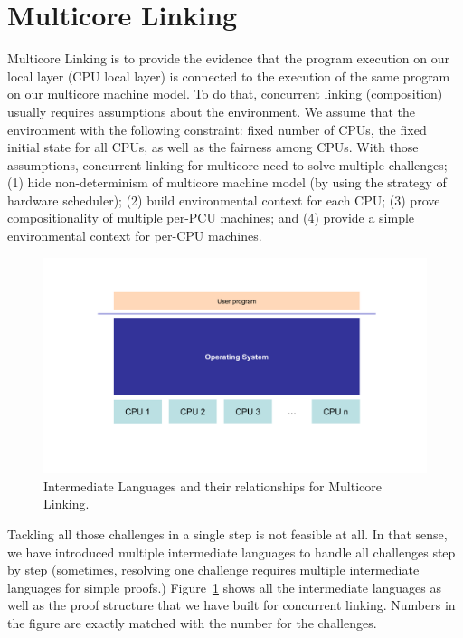 \section{Multicore Linking}
\label{chapter:linking:sec:multicore-linking}

Multicore Linking is to provide the evidence that the program execution on
our local layer (CPU local layer) is connected to the execution of the same program on our multicore machine model. 
To do that, concurrent linking (composition) usually requires assumptions about the environment. 
We assume that the environment with the following constraint:
fixed number of CPUs, the fixed initial state for all CPUs,
as well as the fairness among CPUs.
With those assumptions, 
concurrent linking for multicore need to solve multiple challenges;
(1) hide non-determinism of multicore machine model (by using the strategy of hardware scheduler);
(2) build environmental context for each CPU;
(3) prove compositionality of multiple per-PCU machines;
and (4) provide a simple environmental context for per-CPU machines. 
\begin{figure}
\begin{center}
\includegraphics[width=\textwidth, page=16]{figs/conlink/concurrent_linking}
\end{center}
\caption{Intermediate Languages and their relationships for Multicore Linking.}
\label{fig:chapter:conlink:intermediate-languages-and-their-relationsihps-for-multicore-linking}
\end{figure}
Tackling all those challenges in a single step is not feasible at all. 
In that sense, 
we have introduced multiple intermediate languages 
to handle all challenges step by step (sometimes,
resolving one challenge requires multiple intermediate languages
for simple proofs.) 
Figure~\ref{fig:chapter:conlink:intermediate-languages-and-their-relationsihps-for-multicore-linking} shows
all the intermediate languages as well as the proof structure that we have built for concurrent linking. 
Numbers in the figure are exactly matched with the number for the challenges. 





